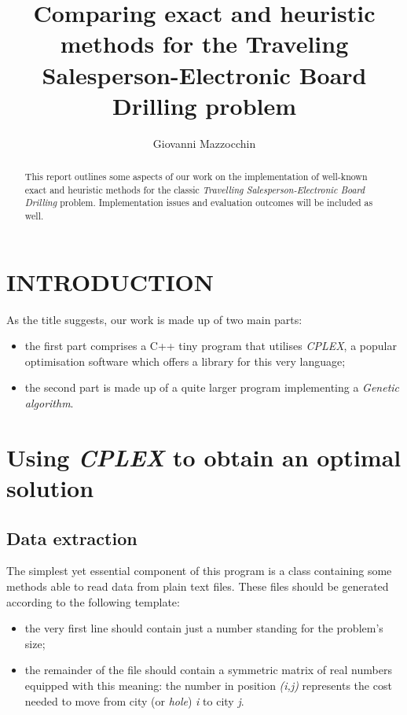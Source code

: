 \documentclass[letterpaper, 10 pt, conference]{ieeeconf}  %
\title{\LARGE \bf
\hspace*{ 0.5 in}Comparing exact and heuristic methods for the  \newline Traveling Salesperson-Electronic Board Drilling problem
}
\author{Giovanni Mazzocchin}%
\begin{document}
\maketitle
\thispagestyle{empty}
\pagestyle{empty}


\begin{abstract}
This report outlines some aspects of our work on the implementation of well-known exact and heuristic methods for the classic \textit{Travelling Salesperson-Electronic Board Drilling} problem.
Implementation issues and evaluation outcomes will be included as well.
\end{abstract}


\section{INTRODUCTION}
As the title suggests, our work is made up of two main parts:
\begin{itemize}
\item the first part comprises a C++ tiny program that utilises \textit{CPLEX}, a popular optimisation software which offers a library for this very language;
\item the second part is made up of a quite larger program implementing a \textit{Genetic algorithm}. 
\end{itemize}

\section{Using \textit{CPLEX} to obtain an optimal solution}

\subsection{Data extraction}
The simplest yet essential component of this program is a class containing some methods able to read data from plain text files. These files should be generated according to the following template:
\begin{itemize}
\item the very first line should contain just a number standing for the problem's size;
\item the remainder of the file should contain a symmetric matrix of real numbers equipped with this meaning: the number in position \textit{(i,j)} represents the cost needed to move from city (or \textit{hole}) \textit{i} to city \textit{j}.
\end{itemize}
\end{document}
